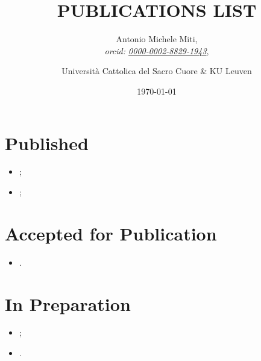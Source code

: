 \documentclass{article}
\title{PUBLICATIONS LIST}
\date{\today}
\author{
	Antonio Michele Miti,\\
	\emph{orcid: \href{https://orcid.org/0000-0002-8829-1943}{0000-0002-8829-1943}},
	\and 
	Università Cattolica del Sacro Cuore \& KU Leuven
}
\begin{document}
  

	\maketitle



  \section*{Published}
	  \begin{itemize}
 	   \item {};
 	   \item {};
	  \end{itemize}

  \section*{Accepted for Publication}
	  \begin{itemize}
 	   \item {}.
	  \end{itemize}


  
  \section*{In Preparation}
	  \begin{itemize}
 	   \item {};
 	   \item {}.
	  \end{itemize}

  
\end{document}
